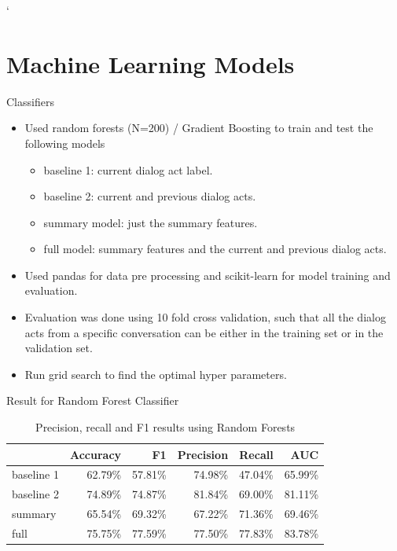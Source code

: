 `%

\section{Machine Learning Models}
\frame{\sectionpage}


\begin{frame}{Classifiers}
 \begin{itemize}
  \item Used random forests (N=200) / Gradient Boosting to train and test the following models
  \begin{itemize}
    \item baseline 1: current dialog act label.
    \item baseline 2: current and previous dialog acts.
    \item summary model: just the summary features.
    \item full model: summary features and the current and previous dialog acts.
  \end{itemize}
  \item Used pandas for data pre processing and scikit-learn for model training and evaluation.
  \item Evaluation was done using 10 fold cross validation, such that all the dialog acts from
        a specific conversation can be either in the training set or in the validation set.
  \item Run grid search to find the optimal hyper parameters.
  \end{itemize}
\end{frame}{}

\begin{frame}{Result for Random Forest Classifier}
\begin{table}[ht!]
\begin{center}
\begin{tabular}{lrrrrr}
\hline
{}  &  Accuracy &        F1 &  Precision &    Recall &   AUC \\
\hline
baseline 1 &  62.79\% &  57.81\% &   74.98\% &  47.04\% &  65.99\% \\
baseline 2 &  74.89\% &  74.87\% &   81.84\% &  69.00\% &  81.11\% \\
summary    &  65.54\% &  69.32\% &   67.22\% &  71.36\% &  69.46\% \\
full       &  75.75\% &  77.59\% &   77.50\% &  77.83\% &  83.78\% \\
\hline
\end{tabular}
\end{center}
\caption{Precision, recall and F1 results using Random Forests }
\label{table:result}
\end{table}
\end{frame}

